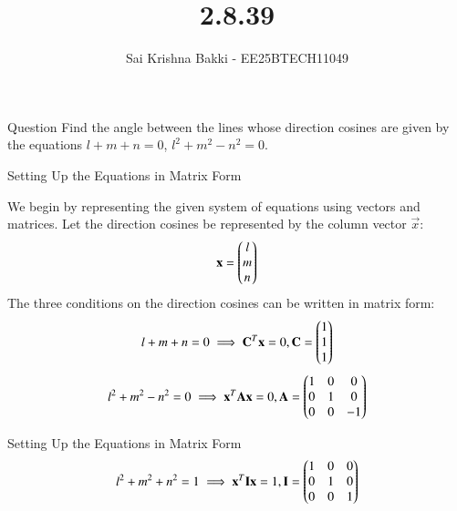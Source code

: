 \documentclass{beamer}
\title %
{2.8.39}
\date{}
\author %
{Sai Krishna Bakki - EE25BTECH11049}
\begin{document}
\frame{\titlepage}
\begin{frame}{Question}
Find the angle between the lines whose direction cosines are given by the equations
 $l+m+n=0$, $l^2+m^2-n^2=0$.
\end{frame}
\begin{frame}{Setting Up the Equations in Matrix Form}

We begin by representing the given system of equations using vectors and matrices. Let the direction cosines be represented by the column vector $\vec{x}$:
\begin{align}
\mathbf{x} = \begin{pmatrix}l\\m\\n\end{pmatrix}
\end{align}
The three conditions on the direction cosines can be written in matrix form:
\begin{align}
 l + m + n = 0 \implies \mathbf{C}^T \mathbf{x} = 0, \mathbf{C} = \begin{pmatrix}1\\1\\1\end{pmatrix}
 \end{align}
 \begin{align}
     l^2 + m^2 - n^2 = 0 \implies \mathbf{x}^T \mathbf{A} \mathbf{x} = 0, \mathbf{A} = \begin{pmatrix} 1 & 0 & 0 \\ 0 & 1 & 0 \\ 0 & 0 & -1 \end{pmatrix}
     \end{align}
     \end{frame}
\begin{frame}{Setting Up the Equations in Matrix Form}
     \begin{align}
     l^2 + m^2 + n^2 = 1 \implies \mathbf{x}^T \mathbf{I} \mathbf{x} = 1, \mathbf{I}=  \begin{pmatrix} 1 & 0 & 0 \\ 0 & 1 & 0 \\ 0 & 0 & 1 \end{pmatrix}
     \end{align}
\end{frame}
\end{document}
